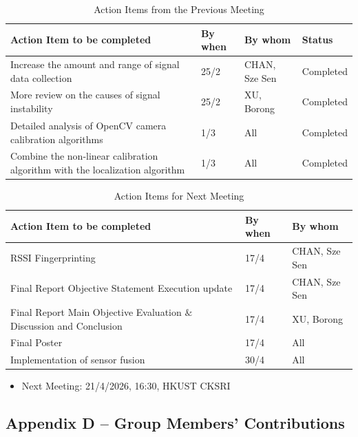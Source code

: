 \documentclass[11pt]{article}
\begin{document}
    \begin{longtable}[c]{|l|l|l|l|}
        \caption{Action Items from the Previous Meeting}\\
        \hline
        \textbf{Action Item to be completed} & \textbf{By when} & \textbf{By whom} & \textbf{Status} \\
        \hline
        \endhead
        Increase the amount and range of signal data collection & 25/2 & CHAN, Sze Sen & Completed \\
        \hline
        More review on the causes of signal instability & 25/2 & XU, Borong & Completed \\
        \hline
        Detailed analysis of OpenCV camera calibration algorithms & 1/3 & All & Completed \\
        \hline
        Combine the non-linear calibration algorithm with the localization algorithm & 1/3 & All & Completed \\
        \hline
    \end{longtable}
    
    \begin{longtable}[c]{|l|l|l|}
        \caption{Action Items for Next Meeting}\\
        \hline
        \textbf{Action Item to be completed} & \textbf{By when} & \textbf{By whom} \\
        \hline
        \endhead
        RSSI Fingerprinting & 17/4 & CHAN, Sze Sen \\
        \hline
        Final Report Objective Statement Execution update & 17/4 & CHAN, Sze Sen \\
        \hline
        Final Report Main Objective Evaluation $\&$ Discussion and Conclusion & 17/4 & XU, Borong \\
        \hline
        Final Poster & 17/4 & All \\
        \hline
        Implementation of sensor fusion & 30/4 & All \\
        \hline
    \end{longtable}
    
    \begin{itemize}
        \item Next Meeting: 21/4/2026, 16:30, HKUST CKSRI
    \end{itemize}
    \newpage
    \subsection*{Appendix D -- Group Members’ Contributions}
\end{document}

